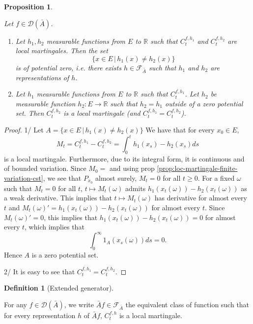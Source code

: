 \documentclass[11pt]{amsart}
\newtheorem{proposition}[theorem]{Proposition}
\theoremstyle{definition}
\newtheorem{definition}[theorem]{Definition}
\theoremstyle{remark}
\newcommand{\depends}[1]{}
\newcommand{\extgen}{\bar{A}}
\newcommand{\Feqgen}{\mathcal{F}_{\extgen}}
\begin{document}
\begin{proposition}\label{prop:eq-class-ext-gen}
\depends{def:ext-gen-domain,def:potential-zero-set}
Let $f \in \mathcal{D}(\extgen)$.
\begin{enumerate}
	\item Let $h_1,h_2$ measurable functions from $E$ to $\mathbb{R}$ such that $C_t^{f,h_1}$ and $C_t^{f,h_2}$ are local martingales. Then the set 
	\[ 
	 \{x \in E \, | \,  h_1(x) \neq h_2(x) \}
	\]
	is of potential zero, i.e. there exists $h\in \Feqgen$ such that $h_1$ and $h_2$ are representations of $h$.
	\item  Let $h_1$ measurable functions from $E$ to $\mathbb{R}$ such that $C_t^{f,h_1}$. Let $h_2$ be measurable function $h_2: E \rightarrow \mathbb{R}$ such that $h_2 = h_1$ outside of a zero potential set. Then $C_t^{f,h_2}$ is a local martingale (and $C_t^{f,h_1}  = C_t^{f,h_2}$).
\end{enumerate}
\end{proposition}
\begin{proof}
1/ Let $A = \{x \in E \, | \, h_1(x) \neq h_2(x) \}$
We have that for every $x_0 \in E$,
\[
	M_t = C_t^{f,h_1} - C_t^{f,h_2} = \int_0^t h_1(x_s) - h_2(x_s) ds
\]
is a local martingale. Furthermore, due to its integral form, it is continuous and of bounded variation. Since $M_0 = $ and using prop \ref{prop:loc-martingale-finite-variation-cst}, we see that $P_{x_0}$ almost surely, $M_t = 0$ for all $t \geq 0$.
For a fixed $\omega$ such that $M_t = 0$ for all $t$, $t \mapsto M_t(\omega)$ admits $h_1(x_t(\omega)) - h_2(x_t(\omega))$ as a weak derivative. This implies that $t \mapsto M_t(\omega)$ has derivative for almost every $t$ and $M_t(\omega)' = h_1(x_t(\omega)) - h_2(x_t(\omega))$ for almost every $t$. Since $M_t(\omega)' = 0$, this implies that $h_1(x_t(\omega)) - h_2(x_t(\omega)) = 0$ for almost every $t$, which implies that
\[
	\int_0^\infty 1_A(x_s(\omega)) ds = 0.
\]
Hence $A$ is a zero potential set.

2/ It is easy to see that $C_t^{f,h_1}  = C_t^{f,h_2}$.
\end{proof}

\begin{definition}[Extended generator]\label{def:ext-gen}
\depends{prop:eq-class-ext-gen,def:potential-zero-set,def:ext-gen-domain}
For any $f \in \mathcal{D}(\extgen)$, we write $\extgen f \in \Feqgen$ the equivalent class of function such that for every representation $h$ of $\extgen f$, $C_t^{f,h}$ is a local martingale.
\end{definition}
\end{document}
